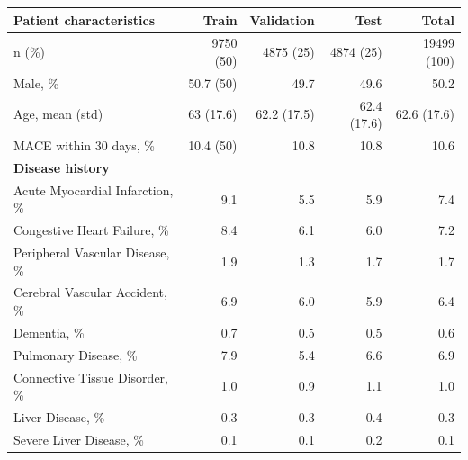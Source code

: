\documentclass[preprint]{elsarticle}
\begin{document}
\renewcommand{\arraystretch}{1.2}
\begin{table}
  \centering
  \begin{footnotesize}
\begin{tabular}{@{}lrrrr@{}}
  \toprule
  \textbf{Patient characteristics} & \textbf{Train} & \textbf{Validation} & \textbf{Test} & \textbf{Total} \\
  \midrule
n (\%)                                           & 9750 (50)      & 4875 (25)           & 4874 (25)     & 19499 (100)    \\
Male, \%                                         & 50.7 (50)      & 49.7                & 49.6          & 50.2           \\
Age, mean (std)                                  & 63 (17.6)      & 62.2 (17.5)         & 62.4 (17.6)   & 62.6 (17.6)    \\
MACE within 30 days, \%                          & 10.4 (50)      & 10.8                & 10.8          & 10.6           \\
\midrule
\textbf{Disease history} & & & & \\
\midrule
Acute Myocardial Infarction, \%                  & 9.1            & 5.5                 & 5.9           & 7.4            \\
Congestive Heart Failure, \%                     & 8.4            & 6.1                 & 6.0           & 7.2            \\
Peripheral Vascular Disease, \%                  & 1.9            & 1.3                 & 1.7           & 1.7            \\
Cerebral Vascular Accident, \%                   & 6.9            & 6.0                 & 5.9           & 6.4            \\
Dementia, \%                                     & 0.7            & 0.5                 & 0.5           & 0.6            \\
Pulmonary Disease, \%                            & 7.9            & 5.4                 & 6.6           & 6.9            \\
Connective Tissue Disorder, \%                   & 1.0            & 0.9                 & 1.1           & 1.0            \\
Liver Disease, \%                                & 0.3            & 0.3                 & 0.4           & 0.3            \\
Severe Liver Disease, \%                         & 0.1            & 0.1                 & 0.2           & 0.1            \\

\end{tabular}
\end{footnotesize}
\end{table}
\end{document}
